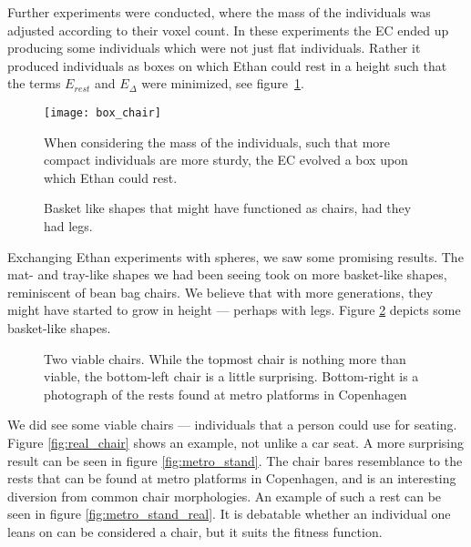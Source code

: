 Further experiments were conducted, where the mass of the individuals was
adjusted according to their voxel count. In these experiments the EC ended up
producing some individuals which were not just flat individuals. Rather it produced
individuals as boxes on which Ethan could rest in a height such that the terms
$E_{rest}$ and $E_\Delta$ were minimized, see figure~\ref{fig:boxchair}.

\begin{figure}[ht]
	\centering
	\texttt{[image: box\_chair]}
	\caption{When considering the mass of the individuals, such that more
	compact individuals are more sturdy, the EC evolved a box upon which
	Ethan could rest.}
	\label{fig:boxchair}
\end{figure}

\begin{figure}[ht]
	\centering
	 \hfil
	\caption{Basket like shapes that might have functioned as chairs, had
	they had legs.}
	\label{fig:baskets}
\end{figure}

Exchanging Ethan experiments with spheres, we saw some promising results. The
mat- and tray-like shapes we had been seeing took on more basket-like shapes,
reminiscent of bean bag chairs. We believe that with more generations, they
might have started to grow in height --- perhaps with legs. Figure
\ref{fig:baskets} depicts some basket-like shapes.

\begin{figure}[ht]
	\centering
	 \hfil
	\caption{Two viable chairs. While the topmost chair is nothing more than
	viable, the bottom-left chair is a little surprising. Bottom-right is a
	photograph of the rests found at metro platforms in Copenhagen}
	\label{fig:viable_chairs}
\end{figure}

We did see some viable chairs --- individuals that a person could use for seating.
Figure \ref{fig:real_chair} shows an example, not unlike a car seat. A more
surprising result can be seen in figure \ref{fig:metro_stand}. The chair bares
resemblance to the rests that can be found at metro platforms in Copenhagen, and
is an interesting diversion from common chair morphologies. An example of such 
a rest can be seen in figure \ref{fig:metro_stand_real}. It is debatable 
whether an individual one leans on can be considered a chair, but it suits the 
fitness function.

